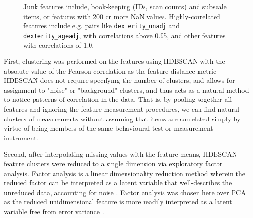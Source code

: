 \documentclass{article}
\begin{document}
\begin{figure}
\centering
\footnotesize


\centering
\normalsize
\caption{Junk features include, book-keeping (IDs, scan counts) and subscale
items, or features with 200 or more NaN values. Highly-correlated features
include e.g\@. pairs like \texttt{dexterity\_unadj} and
\texttt{dexterity\_ageadj}, with correlations above 0.95, and other features
with correlations of 1.0.}
\end{figure}


First, clustering was performed on the features using HDBSCAN
\citep{campelloHierarchicalDensityEstimates2015,JMLR:v12:pedregosa11a} with
the absolute value of the Pearson correlation as the feature distance metric.
HDBSCAN does not require specifying the number of clusters, and allows for
assignment to "noise" or "background" clusters, and thus acts as a natural
method to notice patterns of correlation in the data. That is, by pooling
together all features and ignoring the feature measurement procedures, we can
find natural clusters of measurements without assuming that items are
correlated simply by virtue of being members of the same behavioural test or
measurement instrument.

Second, after interpolating missing values with the feature means, HDBSCAN
feature clusters were reduced to a single dimension via exploratory factor
analysis. Factor analysis is a linear dimensionality reduction method wherein
the reduced factor can be interpreted as a latent variable that
well-describes the unreduced data, accounting for noise
\citep{cattellScientificUseFactor1978,childEssentialsFactorAnalysis2006a}.
Factor analysis was chosen here over PCA as the reduced unidimensional
feature is more readily interpreted as a latent variable free from error
variance \cite{attiasIndependentFactorAnalysis1999}.
\end{document}
